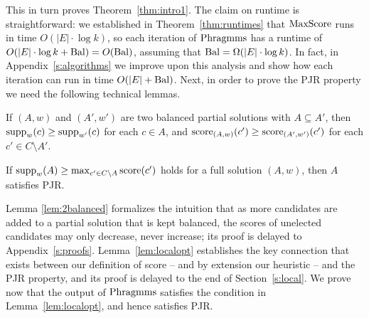 This in turn proves Theorem~\ref{thm:intro1}. 
The claim on runtime is straightforward: we established in Theorem~\ref{thm:runtimes} that $\operatorname{MaxScore}$ runs in time $O(|E|\cdot \log k)$, so each iteration of $\operatorname{Phragmms}$ has a runtime of $O(|E|\cdot \log k + \operatorname{Bal})=O(\operatorname{Bal})$, assuming that $\operatorname{Bal}= \Omega(|E|\cdot \log k)$. 
In fact, in Appendix~\ref{s:algorithms} we improve upon this analysis and show how each iteration can run in time $O(|E| + \operatorname{Bal})$.
Next, in order to prove the PJR property we need the following technical lemmas.

\begin{lemma}\label{lem:2balanced}
If $(A,w)$ and $(A',w')$ are two balanced partial solutions with $A\subseteq A'$, then $\operatorname{supp}_w(c) \geq \operatorname{supp}_{w'}(c)$ for each $c\in A$, and $\operatorname{score}_{(A,w)}(c')\geq \operatorname{score}_{(A',w')}(c')$ for each $c'\in C\setminus A'$.
\end{lemma}

\begin{lemma}\label{lem:localopt}
If $\operatorname{supp}_w(A)\geq \max_{c'\in C\setminus A} \operatorname{score}(c')$ holds for a full solution $(A,w)$, then $A$ satisfies PJR.
\end{lemma}

Lemma \ref{lem:2balanced} formalizes the intuition that as more candidates are added to a partial solution that is kept balanced, the scores of unelected candidates may only decrease, never increase; its proof is delayed to Appendix~\ref{s:proofs}.
Lemma~\ref{lem:localopt} establishes the key connection that exists between our definition of score -- and by extension our heuristic -- and the PJR property, and its proof is delayed to the end of Section~\ref{s:local}. 
We prove now that the output of $\operatorname{Phragmms}$ satisfies the condition in Lemma~\ref{lem:localopt}, and hence satisfies PJR.

